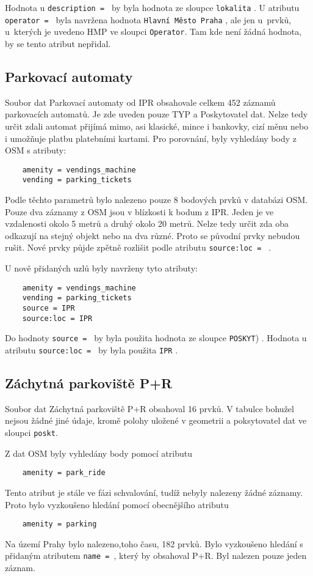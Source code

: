 Hodnota u {\tt description~= } by byla hodnota ze sloupce {\tt lokalita} .
U atributu {\tt operator~= } byla navržena hodnota {\tt Hlavní Město Praha} ,
ale jen u~prvků, u~kterých je uvedeno HMP ve sloupci {\tt Operator}.
Tam kde není žádná hodnota, by se tento atribut nepřidal.


\subsection{Parkovací automaty}
\label{Parkovací automaty}
Soubor dat Parkovací automaty od IPR obsahovale celkem 452 záznamů parkovacích
automatů. Je zde uveden pouze TYP a Poskytovatel dat. Nelze tedy určit zdali
automat přijímá mimo, asi klasické, mince i bankovky, cizí měnu nebo i umožňuje
platbu platebními kartami.
Pro porovnání, byly vyhledány body z OSM s atributy:
\begin{verbatim}
    amenity = vendings_machine
    vending = parking_tickets
\end{verbatim}
Podle těchto parametrů bylo nalezeno pouze 8 bodových prvků v databázi OSM.
Pouze dva záznamy z OSM jsou v blízkosti k bodum z IPR.
Jeden je ve vzdalenosti okolo 5 metrů a druhý okolo 20 metrů. Nelze tedy určit
zda oba odkazují na stejný objekt nebo na dva různé.
Proto se původní prvky nebudou rušit. Nové prvky půjde zpětně rozlišit podle
atributu {\tt source:loc~= } .

U nově přidaných uzlů byly navrženy tyto atributy:
\begin{verbatim}
    amenity = vendings_machine
    vending = parking_tickets
    source = IPR
    source:loc = IPR
\end{verbatim}
Do hodnoty {\tt source~= } by byla použita hodnota ze sloupce {\tt POSKYT}) .
Hodnota u atributu {\tt source:loc~= } by byla použita {\tt IPR} .

\subsection{Záchytná parkoviště P+R}
\label{Záchytná parkoviště P+R}
Soubor dat Záchytná parkoviště P+R obsahoval 16 prvků.
V tabulce bohužel nejsou žádné jiné údaje, kromě polohy uložené v geometrii
a poksytovatel dat ve sloupci {\tt poskt}.

Z dat OSM byly vyhledány body pomocí atributu
\begin{verbatim}
    amenity = park_ride
\end{verbatim}
Tento atribut je stále ve fázi schvalování, tudíž nebyly nalezeny žádné záznamy.
Proto bylo vyzkoušeno hledání pomocí obecnějšího atributu
\begin{verbatim}
    amenity = parking
\end{verbatim}
Na území Prahy bylo nalezeno,toho času, 182 prvků.
Bylo vyzkoušeno hledání s přidaným atributem {\tt name~= }, který by obsahoval P+R.
Byl nalezen pouze jeden záznam.

